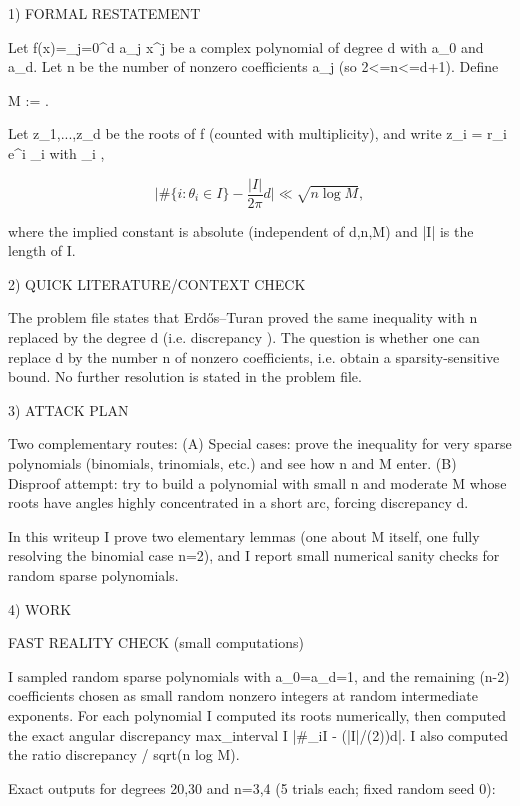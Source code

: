 
1) FORMAL RESTATEMENT

Let
  f(x)=\sum_{j=0}^d a_j x^j
be a complex polynomial of degree d with a_0 and a_d.
Let n be the number of nonzero coefficients a_j (so 2<=n<=d+1).
Define

  M := .

Let z_1,...,z_d be the roots of f (counted with multiplicity), and write
  z_i = r_i e^{i \theta_i} with \theta_i \in [0,2\pi).

Conjectured discrepancy bound:
For every interval I\subset[0,2\pi],

\[
  \Big| \#\{i: \theta_i \in I\} - \frac{|I|}{2\pi} d \Big| \ll \sqrt{n \log M},
\]

where the implied constant is absolute (independent of d,n,M) and |I| is the length of I.

2) QUICK LITERATURE/CONTEXT CHECK

The problem file states that Erd\H{o}s--Turan proved the same inequality with n replaced by
the degree d (i.e. discrepancy \ll {}). The question is whether one can replace
d by the number n of nonzero coefficients, i.e. obtain a sparsity-sensitive bound.
No further resolution is stated in the problem file.

3) ATTACK PLAN

Two complementary routes:
(A) Special cases: prove the inequality for very sparse polynomials (binomials, trinomials,
    etc.) and see how n and M enter.
(B) Disproof attempt: try to build a polynomial with small n and moderate M whose roots have
    angles highly concentrated in a short arc, forcing discrepancy \gg d.

In this writeup I prove two elementary lemmas (one about M itself, one fully resolving the
binomial case n=2), and I report small numerical sanity checks for random sparse polynomials.

4) WORK

FAST REALITY CHECK (small computations)

I sampled random sparse polynomials with a_0=a_d=1, and the remaining (n-2) coefficients
chosen as small random nonzero integers at random intermediate exponents. For each polynomial
I computed its roots numerically, then computed the exact angular discrepancy
  max_{interval I} |#{\theta_i\in I} - (|I|/(2\pi))d|.
I also computed the ratio discrepancy / sqrt(n log M).

Exact outputs for degrees 20,30 and n=3,4 (5 trials each; fixed random seed 0):

